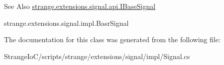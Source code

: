 \begin{DoxySeeAlso}{See Also}
\hyperlink{interfacestrange_1_1extensions_1_1signal_1_1api_1_1_i_base_signal}{strange.\-extensions.\-signal.\-api.\-I\-Base\-Signal} 

strange.\-extensions.\-signal.\-impl.\-Basr\-Signal 
\end{DoxySeeAlso}


The documentation for this class was generated from the following file\-:\begin{DoxyCompactItemize}
\item 
Strange\-Io\-C/scripts/strange/extensions/signal/impl/Signal.\-cs\end{DoxyCompactItemize}
